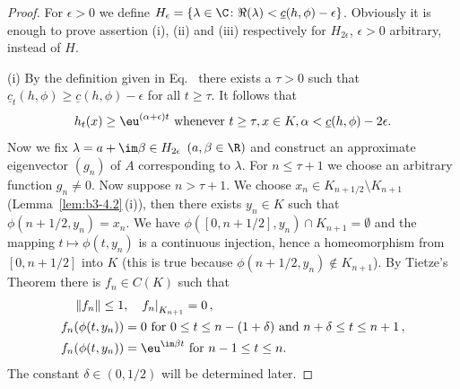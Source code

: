 \begin{proof}
	For $\epsilon > 0$ we define $H_{\epsilon} = \{\lambda \in \C \colon \Re(\lambda) < \underline{c}(h,\phi)-\epsilon\}$.
	Obviously it is enough to prove assertion (i), (ii) and (iii) respectively for $H_{2\epsilon}$, $\epsilon> 0$ arbitrary, instead of\/ $H$.

	(i) By the definition given in Eq.~ there exists a $\tau > 0$ such that $\underline{c}_{t}(h,\phi) \geq \underline{c}(h,\phi) - \epsilon$ for all $t \geq \tau$.
	It follows that
	\begin{equation}\label{eq:b3-4.5}
		h_{t}(x) \geq \eu^{(\alpha + \epsilon)t} \text{ whenever } t \geq \tau, x \in K, \alpha < \underline{c}(h,\phi)-2\epsilon .
	\end{equation}
	Now we fix $\lambda = a + \im\beta \in H_{2\epsilon}$ $(a,\beta \in \R)$ and construct an approximate eigenvector $(g_{n})$ of\/ $A$ 
    corresponding to $\lambda$.
	For $n \leq \tau + 1$ we choose an arbitrary function $g_{n} \neq 0$.
	Now suppose $n > \tau + 1$.
	We choose $x_{n} \in K_{n+1/2} \setminus K_{n+1}$ (\cf Lemma~\ref{lem:b3-4.2}\,(i)), then there exists $y_{n} \in K$ such that $\phi(n+1/2,y_{n}) = x_{n}$.
	We have $\phi([0,n+1/2],y_{n}) \cap K_{n+1} = \emptyset$ and the mapping $t \mapsto \phi(t,y_{n})$ is a continuous injection, hence a homeomorphism from $[0,n+1/2]$ into $K$ (this is true because $\phi(n+1/2,y_{n}) \notin K_{n+1}$).
	By Tietze's Theorem there is $f_{n} \in C(K)$ such that
	\begin{equation}\label{eq:b3-4.6}
		\begin{aligned}
			\|f_{n}\| \leq 1 &, \quad {f_{n}|}_{K_{n+1}} = 0\,, \\
			f_{n}(\phi(t,y_{n})) &= 0 \text{ for } 0 \leq t \leq n-(1+\delta) \text{ and } n+\delta \leq t \leq n+1\,, \\
			f_{n}(\phi(t,y_{n})) &= \eu^{\im\beta  t} \text{ for } n-1 \leq t \leq n .
		\end{aligned}
	\end{equation}
	The constant $\delta \in (0,1/2)$ will be determined later.
	

\end{proof}

